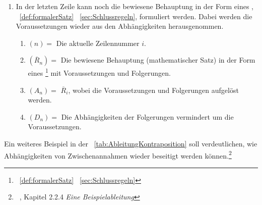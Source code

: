 \begin{enumerate}
\begin{enumerate}
		\item $(D_n) =$ Die Abhängigkeiten von $R_i$ \textbzw der Verweis auf die verwendete allgemeine Schlussregel, sowie die Abhängigkeiten aller $A_j$ aus $Z_i$, welches jeweils die von $D_j$ sind.%
		\footnote{Wenn $D_n$ leer ist, dann ist $A_n$ allgemeingültig.}
	\end{enumerate}
	\item In der letzten Zeile kann noch die bewiesene Behauptung in der Form eines , \seename~\eqref{def:formalerSatz} \sectionname~\vref{sec:Schlussregeln}, formuliert werden.
	Dabei werden die Voraussetzungen wieder aus den Abhängigkeiten herausgenommen.
	\begin{enumerate}
		\item $(n) =$ Die aktuelle Zeilennummer $i$.
		\item $(\overline{R}_n) =$ Die bewiesene Behauptung (mathematischer Satz) in der Form eines \emph{}\footnote{\seename~\eqref{def:formalerSatz} \sectionname~\vref{sec:Schlussregeln}} mit Voraussetzungen und Folgerungen.
		\item $(A_n) =$ $\overline{R}_i$, wobei die Voraussetzungen und Folgerungen aufgelöst werden.
		\item $(D_n) =$ Die Abhängigkeiten der Folgerungen vermindert um die Voraussetzungen.
	\end{enumerate}
\end{enumerate}

Ein weiteres Beispiel in der \tablename~\vref{tab:AbleitungKontraposition} soll verdeutlichen, wie Abhängigkeiten von Zwischenannahmen wieder beseitigt werden können.\footnote{\seename~\cite{bib:NatuerlichesSchliessen}, Kapitel 2.2.4 \emph{Eine Beispielableitung}}

